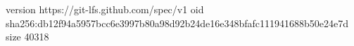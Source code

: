 version https://git-lfs.github.com/spec/v1
oid sha256:db12f94a5957bcc6e3997b80a98d92b24de16e348bfafc111941688b50e24e7d
size 40318
